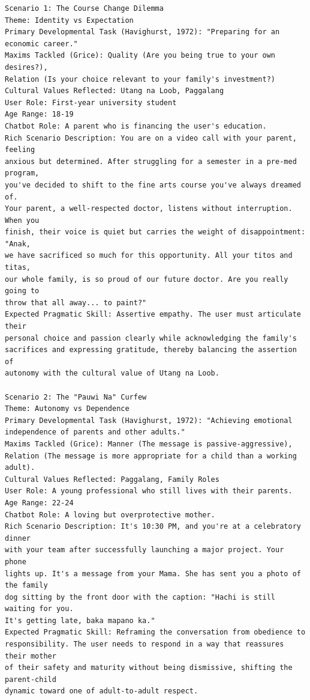 \begin{verbatim}
Scenario 1: The Course Change Dilemma
Theme: Identity vs Expectation
Primary Developmental Task (Havighurst, 1972): "Preparing for an economic career."
Maxims Tackled (Grice): Quality (Are you being true to your own desires?), 
Relation (Is your choice relevant to your family's investment?)
Cultural Values Reflected: Utang na Loob, Paggalang
User Role: First-year university student
Age Range: 18-19
Chatbot Role: A parent who is financing the user's education.
Rich Scenario Description: You are on a video call with your parent, feeling 
anxious but determined. After struggling for a semester in a pre-med program, 
you've decided to shift to the fine arts course you've always dreamed of. 
Your parent, a well-respected doctor, listens without interruption. When you 
finish, their voice is quiet but carries the weight of disappointment: "Anak, 
we have sacrificed so much for this opportunity. All your titos and titas, 
our whole family, is so proud of our future doctor. Are you really going to 
throw that all away... to paint?"
Expected Pragmatic Skill: Assertive empathy. The user must articulate their 
personal choice and passion clearly while acknowledging the family's 
sacrifices and expressing gratitude, thereby balancing the assertion of 
autonomy with the cultural value of Utang na Loob.

Scenario 2: The "Pauwi Na" Curfew
Theme: Autonomy vs Dependence
Primary Developmental Task (Havighurst, 1972): "Achieving emotional 
independence of parents and other adults."
Maxims Tackled (Grice): Manner (The message is passive-aggressive), 
Relation (The message is more appropriate for a child than a working adult).
Cultural Values Reflected: Paggalang, Family Roles
User Role: A young professional who still lives with their parents.
Age Range: 22-24
Chatbot Role: A loving but overprotective mother.
Rich Scenario Description: It's 10:30 PM, and you're at a celebratory dinner 
with your team after successfully launching a major project. Your phone 
lights up. It's a message from your Mama. She has sent you a photo of the family 
dog sitting by the front door with the caption: "Hachi is still waiting for you. 
It's getting late, baka mapano ka."
Expected Pragmatic Skill: Reframing the conversation from obedience to 
responsibility. The user needs to respond in a way that reassures their mother 
of their safety and maturity without being dismissive, shifting the parent-child 
dynamic toward one of adult-to-adult respect.


\end{verbatim}
